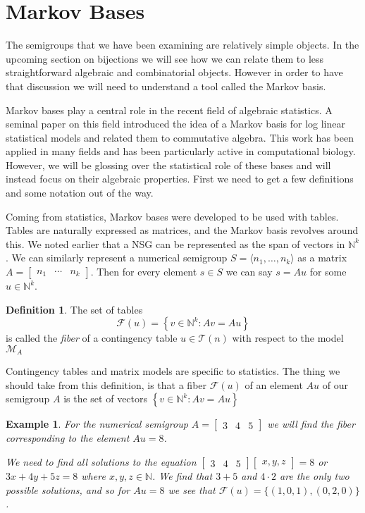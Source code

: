 \documentclass[11pt]{amsart}
\theoremstyle{plain}
\newtheorem{exa}{Example}
\theoremstyle{definition}
\newtheorem{defi}{Definition}
\begin{document}
\section{Markov Bases}
The semigroups that we have been examining are relatively simple objects. In the upcoming section on bijections we will see how we can relate them to less straightforward algebraic and combinatorial objects. However in order to have that discussion we will need to understand a tool called the Markov basis.

Markov bases play a central role in the recent field of algebraic statistics.
A seminal paper\cite{markstats} on this field introduced the idea of a
Markov basis for log linear statistical models and related them
to commutative algebra. This work has been applied in many fields and has been
particularly active in computational biology\cite{bernd}. However, we will be glossing over
the statistical role of these bases and will instead focus on their algebraic
properties. First we need to get a few definitions and some notation out of the
way.

Coming from statistics, Markov bases were developed to be used with tables.
Tables are naturally expressed as matrices, and the Markov basis
revolves around this. We noted earlier that a NSG can be represented as the
span of vectors in $\mathbb{N}^k$. We can similarly represent a numerical semigroup $S=\langle n_1,\dots,n_k \rangle$ as a
matrix $A=\left[\begin{array}{rrr}n_1&\cdots&n_k\end{array}\right]$. Then for
every element $s\in S$ we can say $s=Au$ for some $u\in \mathbb{N}^k$.

\begin{defi}
  \cite{bernd}
  The set of tables
  \[\mathcal{F}(u)=\left\{v\in \mathbb{N}^k:Av=Au\right\}\]
  is called the \emph{fiber} of a contingency table $u\in \mathcal{T}(n)$ with
  respect to the model $\mathcal{M}_A$
\end{defi}

Contingency tables and matrix models are specific to statistics. The thing we
should take from this definition, is that a fiber $\mathcal{F}(u)$ of an element
$Au$ of our semigroup $A$ is the set of vectors $\left\{v\in \mathbb{N}^k:Av=Au
\right\}$
\begin{exa}
  For the numerical semigroup $A=\left[\begin{array}{rrr}3&4&5\end{array}\right]$
  we will find the fiber corresponding to the element $Au=8$.

  We need to find all solutions to the equation $\left[\begin{array}{rrr}3&4&5
\end{array}\right]\left[\begin{array}{rrr}x,y,z \end{array}\right]=8$ or
$3x+4y+5z=8$ where $x,y,z\in \mathbb{N}$. We find that $3+5$ and $4\cdot 2$ are
the only two possible solutions, and so for $Au=8$ we see that $\mathcal{F}(u)=
\{(1,0,1),(0,2,0)\}$.
\end{exa}
\end{document}

